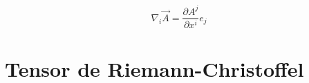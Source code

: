 \documentclass[a0,portrait]{a0poster} %
\begin{document}
\begin{multicols}{2}
\begin{equation*}
    \nabla_i\vec{A} = \frac{\partial A^j}{\partial x^i}e_j
\end{equation*}


\end{multicols}
\vspace{1cm}
\section*{\Centering Tensor de Riemann-Christoffel}
\end{document}
